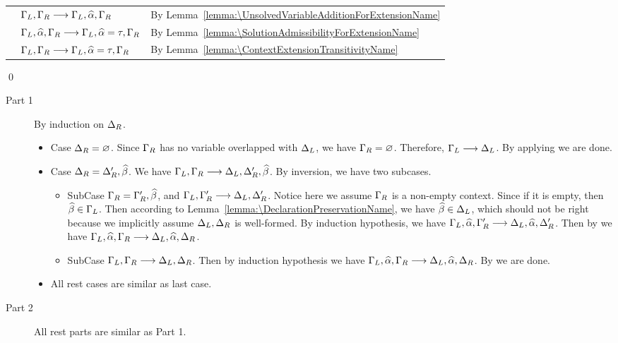 \proof

\mbox{} %
\begin{longtable}[l]{lll}
  & $\Gamma_L, \Gamma_R \longrightarrow \Gamma_L, \widehat{\alpha}, \Gamma_R $ & By
  Lemma~\ref{lemma:\UnsolvedVariableAdditionForExtensionName} \\
  & $\Gamma_L, \widehat{\alpha}, \Gamma_R \longrightarrow \Gamma_L, \widehat{\alpha} = \tau, \Gamma_R $ & By
  Lemma~\ref{lemma:\SolutionAdmissibilityForExtensionName} \\
  & $\Gamma_L, \Gamma_R \longrightarrow \Gamma_L, \widehat{\alpha} = \tau, \Gamma_R$ &
  By Lemma~\ref{lemma:\ContextExtensionTransitivityName}
\end{longtable}

\qed

\begin{lemma}[\ParallelAdmissibilityName]\leavevmode
  \label{lemma:\ParallelAdmissibilityName}
  \ParallelAdmissibilityBody
\end{lemma}

\proof

\begin{description}
  \item [Part 1] By induction on $\Delta_R$.
    \begin{itemize}
    \item Case $\Delta_R = \varnothing$.
      Since $\Gamma_R$ has no variable overlapped with $\Delta_L$,
      we have $\Gamma_R = \varnothing$.
      Therefore, $\Gamma_L \longrightarrow \Delta_L$.
      By applying  we are done.
    \item Case $\Delta_R = \Delta_R', \widehat{\beta}$.
      We have $\Gamma_L, \Gamma_R \longrightarrow \Delta_L, \Delta_R', \widehat{\beta}$.
      By inversion, we have two subcases.
      \begin{itemize}
      \item SubCase $\Gamma_R = \Gamma_R', \widehat{\beta}$,
        and $\Gamma_L, \Gamma_R' \longrightarrow \Delta_L, \Delta_R'$.
        Notice here we assume $\Gamma_R$ is a non-empty context.
        Since if it is empty, then $\widehat{\beta} \in \Gamma_L$.
        Then according to Lemma~\ref{lemma:\DeclarationPreservationName},
        we have $\widehat{\beta} \in \Delta_L$, which should not be right because we
        implicitly assume $\Delta_L, \Delta_R$ is well-formed.
        By induction hypothesis,
        we have $\Gamma_L, \widehat{\alpha}, \Gamma_R' \longrightarrow \Delta_L, \widehat{\alpha}, \Delta_R'$.
        Then by 
        we have $\Gamma_L, \widehat{\alpha}, \Gamma_R \longrightarrow \Delta_L, \widehat{\alpha}, \Delta_R$.
      \item SubCase $\Gamma_L, \Gamma_R \longrightarrow \Delta_L, \Delta_R$.
        Then by induction hypothesis we have
        $\Gamma_L, \widehat{\alpha}, \Gamma_R \longrightarrow \Delta_L, \widehat{\alpha}, \Delta_R$.
        By  we are done.
      \end{itemize}
    \item All rest cases are similar as last case.
    \end{itemize}
  \item [Part 2] All rest parts are similar as Part 1.
\end{description}

